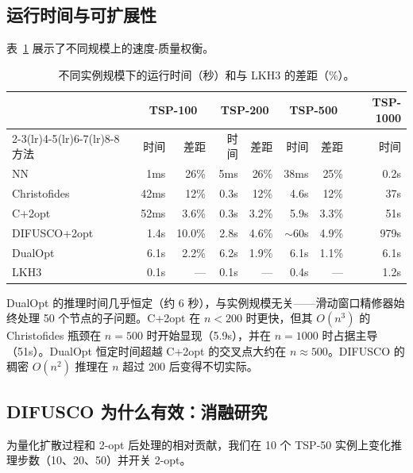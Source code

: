 \documentclass[11pt,a4paper]{ctexart}
\begin{document}
\subsection{运行时间与可扩展性}

表~\ref{tab:scaling} 展示了不同规模上的速度-质量权衡。

\begin{table}[H]
\centering
\small
\caption{不同实例规模下的运行时间（秒）和与 LKH3 的差距（\%）。}
\label{tab:scaling}
\begin{tabular}{@{}lrrrrrrr@{}}
\toprule
& \multicolumn{2}{c}{TSP-100} & \multicolumn{2}{c}{TSP-200} & \multicolumn{2}{c}{TSP-500} & TSP-1000 \\
\cmidrule(lr){2-3}\cmidrule(lr){4-5}\cmidrule(lr){6-7}\cmidrule(lr){8-8}
方法 & 时间 & 差距 & 时间 & 差距 & 时间 & 差距 & 时间 \\
\midrule
NN & 1ms & 26\% & 5ms & 26\% & 38ms & 25\% & 0.2s \\
Christofides & 42ms & 12\% & 0.3s & 12\% & 4.6s & 12\% & 37s \\
C+2opt & 52ms & 3.6\% & 0.3s & 3.2\% & 5.9s & 3.3\% & 51s \\
DIFUSCO+2opt & 1.4s & 10.0\% & 2.8s & 4.6\% & $\sim$60s & 4.9\% & 979s \\
DualOpt & 6.1s & 2.2\% & 6.2s & 1.9\% & 6.1s & 1.1\% & 6.1s \\
LKH3 & 0.1s & --- & 0.1s & --- & 0.4s & --- & 1.2s \\
\bottomrule
\end{tabular}
\end{table}

DualOpt 的推理时间几乎恒定（约 6 秒），与实例规模无关——滑动窗口精修器始终处理 50 个节点的子问题。C+2opt 在 $n < 200$ 时更快，但其 $O(n^3)$ 的 Christofides 瓶颈在 $n=500$ 时开始显现（5.9s），并在 $n=1000$ 时占据主导（51s）。DualOpt 恒定时间超越 C+2opt 的交叉点大约在 $n \approx 500$。DIFUSCO 的稠密 $O(n^2)$ 推理在 $n$ 超过 200 后变得不切实际。

\subsection{DIFUSCO 为什么有效：消融研究}

为量化扩散过程和 2-opt 后处理的相对贡献，我们在 10 个 TSP-50 实例上变化推理步数（10、20、50）并开关 2-opt。
\end{document}
